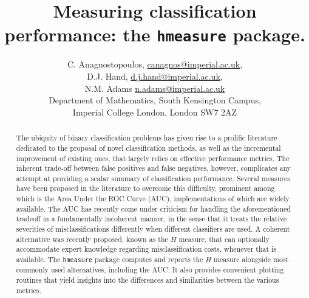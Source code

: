 \documentclass{article}
\begin{document}


\title{Measuring classification performance: the \texttt{hmeasure} package.}

\author{C. Anagnostopoulos, \url{canagnos@imperial.ac.uk}, \\ D.J. Hand, \url{d.j.hand@imperial.ac.uk}, 
\\ N.M. Adams \url{n.adams@imperial.ac.uk} \\Department of Mathematics, South Kensington Campus,\\ Imperial College London, London SW7 2AZ}
\maketitle
\begin{abstract}
The ubiquity of binary classification problems has given rise to a prolific literature dedicated to the proposal of novel classification methods, as well as the incremental improvement of existing ones, that largely relies on effective performance metrics. The inherent trade-off between false positives and false negatives, however, complicates any attempt at providing a scalar summary of classification performance. Several measures have been proposed in the literature to overcome this difficulty, prominent among which is the Area Under the ROC Curve (AUC), implementations of which are widely available. The AUC has recently come under criticism for handling the aforementioned tradeoff in a fundamentally incoherent manner, in the sense that it treats the relative severities of misclassifications differently when different classifiers are used. A coherent alternative was recently proposed, known as the $H$ measure, that can optionally accommodate expert knowledge regarding misclassification costs, whenever that is available. The \texttt{hmeasure} package computes and reports the $H$ measure alongside most commonly used alternatives, including the AUC. It also provides convenient plotting routines that yield insights into the differences and similarities between the various metrics. 
\end{abstract}

\end{document}
